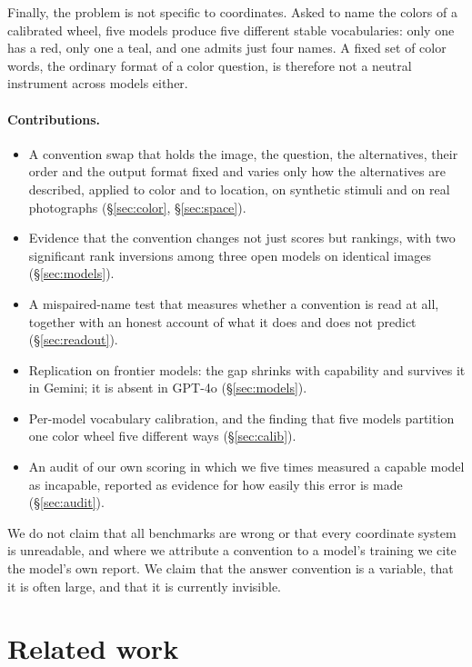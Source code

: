 \documentclass{article}
\begin{document}
Finally, the problem is not specific to coordinates. Asked to name the colors of
a calibrated wheel, five models produce five different stable vocabularies: only one has a red, only one a teal, and one admits just four names. A
fixed set of color words, the ordinary format of a color question, is therefore
not a neutral instrument across models either.

\paragraph{Contributions.}
\begin{itemize}
\item A convention swap that holds the image, the question, the alternatives, their
  order and the output format fixed and varies only how the alternatives are
  described, applied to color and to location, on synthetic stimuli and on real
  photographs (\S\ref{sec:color}, \S\ref{sec:space}).
\item Evidence that the convention changes not just scores but rankings, with two
  significant rank inversions among three open models on identical images
  (\S\ref{sec:models}).
\item A mispaired-name test that measures whether a convention is read at all,
  together with an honest account of what it does and does not predict
  (\S\ref{sec:readout}).
\item Replication on frontier models: the gap shrinks with capability and survives
  it in Gemini; it is absent in GPT-4o (\S\ref{sec:models}).
\item Per-model vocabulary calibration, and the finding that five models partition
  one color wheel five different ways (\S\ref{sec:calib}).
\item An audit of our own scoring in which we five times measured a capable model
  as incapable, reported as evidence for how easily this error is made
  (\S\ref{sec:audit}).
\end{itemize}

We do not claim that all benchmarks are wrong or that every coordinate system is
unreadable, and where we attribute a convention to a model's training we cite the
model's own report. We claim that the answer convention is a variable, that it is
often large, and that it is currently invisible.

\section{Related work}
\label{sec:related}
\end{document}
